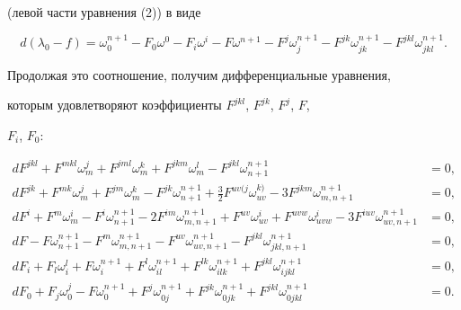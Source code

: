 (левой части уравнения (2)) в виде


$$


d(\lambda_0-f)=\omega_0^{n+1}-F_0\omega^0-


F_i\omega^i-F\omega^{n+1}-F^j\omega^{n+1}_j-F^{jk}\omega_{jk}^{n+1}


-F^{jkl}\omega_{jkl}^{n+1}.


$$





Продолжая это соотношение, получим дифференциальные уравнения, 


которым удовлетворяют коэффициенты $F^{jkl}$, $F^{jk}$, $F^j$, $F$,


$F_i$, $F_0$:


\begin{align*}


dF^{jkl}+F^{mkl}{\omega }_m^j+F^{jml}{\omega }_m^k+


F^{jkm}{\omega }^l_m-F^{jkl}{\omega }^{n+1}_{n+1}&=0, \\


%


dF^{jk}+F^{mk}{\omega }^j_m+F^{jm}{\omega }_m^k-


F^{jk}{\omega }^{n+1}_{n+1}+\frac32 F^{uv(j}{\omega }^{k)}_{uv}-


3F^{jkm}{\omega }^{n+1}_{m,n+1}&=0, \\


%


dF^i+F^m{\omega }^i_m -F^i{\omega }^{n+1}_{n+1}-


2F^{im}{\omega }^{n+1}_{m,n+1}


+F^{uv}{\omega }^i_{uv}+F^{uvw}{\omega }^i_{uvw} -


3F^{iuv}{\omega }^{n+1}_{uv,n+1}&=0, \\


%


dF-F{\omega }^{n+1}_{n+1}-F^{m}{\omega }^{n+1}_{m,{n+1}}-


F^{uv}{\omega }^{n+1}_{uv,n+1}-F^{jkl}{\omega }^{n+1}_{jkl,n+1}&=0, \\


%


dF_i+F_l{\omega }^l_i+F{\omega }^{n+1}_i+F^l{\omega }^{n+1}_{il}


+F^{lk}{\omega }^{n+1}_{ilk}+F^{jkl}{\omega }_{ijkl}^{n+1}&=0, \\


%


dF_0+F_j{\omega }^j_0-F{\omega }^{n+1}_0+


F^j{\omega }_{0j}^{n+1}+F^{jk}{\omega }_{0jk}^{n+1}


+F^{jkl}{\omega }^{n+1}_{0jkl}&=0.


\end{align*}





